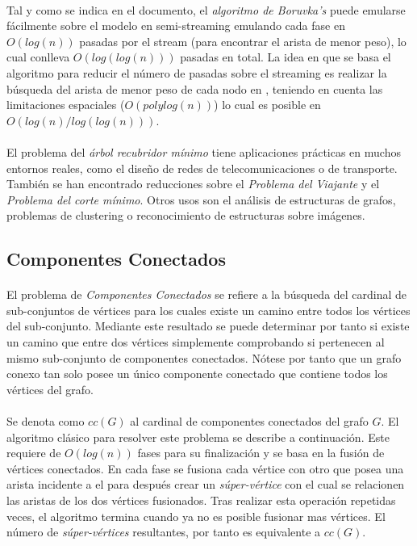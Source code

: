 \documentclass{subfiles}
\begin{document}
        \paragraph{}
        Tal y como se indica en el documento, el \emph{algoritmo de Boruvka’s} puede emularse fácilmente sobre el modelo en semi-streaming emulando cada fase en $O(log(n))$ pasadas por el stream (para encontrar el arista de menor peso), lo cual conlleva $O(log(log(n)))$ pasadas en total. La idea en que se basa el algoritmo para reducir el número de pasadas sobre el streaming es realizar la búsqueda del arista de menor peso de cada nodo en , teniendo en cuenta las limitaciones espaciales ($O(polylog(n))$) lo cual es posible en $O(log(n)/log(log(n)))$.


        \paragraph{}
        El problema del \emph{árbol recubridor mínimo} tiene aplicaciones prácticas en muchos entornos reales, como el diseño de redes de telecomunicaciones o de transporte. También se han encontrado reducciones sobre el \emph{Problema del Viajante} y el \emph{Problema del corte mínimo}. Otros usos son el análisis de estructuras de grafos, problemas de clustering o reconocimiento de estructuras sobre imágenes.

      \subsection{Componentes Conectados}
      \label{sec:graph_connected_components}

        \paragraph{}
        El problema de \emph{Componentes Conectados} se refiere a la búsqueda del cardinal de sub-conjuntos de vértices para los cuales existe un camino entre todos los vértices del sub-conjunto. Mediante este resultado se puede determinar por tanto si existe un camino que entre dos vértices simplemente comprobando si pertenecen al mismo sub-conjunto de componentes conectados. Nótese por tanto que un grafo conexo tan solo posee un único componente conectado que contiene todos los vértices del grafo.

        \paragraph{}
        Se denota como $cc(G)$ al cardinal de componentes conectados del grafo $G$. El algoritmo clásico para resolver este problema se describe a continuación. Este requiere de $O(log(n))$ fases para su finalización y se basa en la fusión de vértices conectados. En cada fase se fusiona cada vértice con otro que posea una arista incidente a el para después crear un \emph{súper-vértice} con el cual se relacionen las aristas de los dos vértices fusionados. Tras realizar esta operación repetidas veces, el algoritmo termina cuando ya no es posible fusionar mas vértices. El número de \emph{súper-vértices} resultantes, por tanto es equivalente a $cc(G)$.
\end{document}
